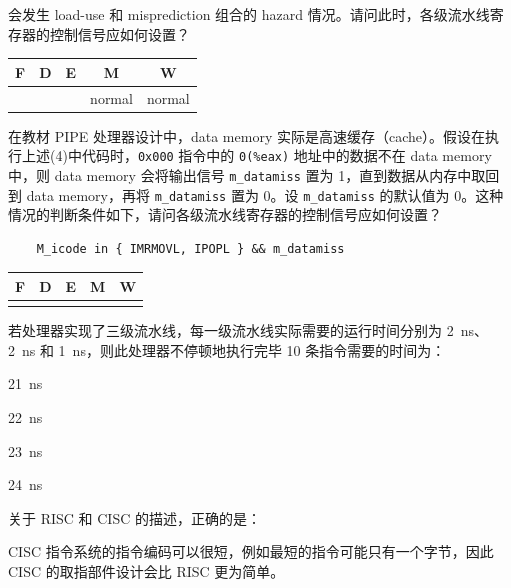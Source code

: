 \begin{problems}
        会发生 load-use 和 misprediction 组合的 hazard 情况。请问此时，各级流水线寄存器的控制信号应如何设置？
        \begin{table}[H]
            \centering
            \begin{tabular}{|c|c|c|c|c|}
                \hline
                F & D & E & M & W \\ \hline
                {\qquad \qquad} & {\qquad \qquad} & {\qquad \qquad} & normal & normal \\ \hline
            \end{tabular}
        \end{table}
        \qn 在教材 PIPE 处理器设计中，data memory 实际是高速缓存（cache）。假设在执行上述(4)中代码时，\verb|0x000| 指令中的 \verb|0(%eax)| 地址中的数据不在 data memory 中，则 data memory 会将输出信号 \verb|m_datamiss| 置为 1，直到数据从内存中取回到 data memory，再将 \verb|m_datamiss| 置为 0。设 \verb|m_datamiss| 的默认值为 0。这种情况的判断条件如下，请问各级流水线寄存器的控制信号应如何设置？
        \begin{verbatim}
    M_icode in { IMRMOVL, IPOPL } && m_datamiss
        \end{verbatim}
        \begin{table}[H]
            \centering
            \begin{tabular}{|c|c|c|c|c|}
                \hline
                F & D & E & M & W \\ \hline
                {\qquad \qquad} & {\qquad \qquad} & {\qquad \qquad} & {\qquad \qquad} & {\qquad \qquad} \\ \hline
            \end{tabular}
        \end{table}
         若处理器实现了三级流水线，每一级流水线实际需要的运行时间分别为 \SI{2}{ns}、\SI{2}{ns} 和 \SI{1}{ns}，则此处理器不停顿地执行完毕 10 条指令需要的时间为：
        \begin{choices}
            \item \SI{21}{ns}
            \item \SI{22}{ns}
            \item \SI{23}{ns}
            \item \SI{24}{ns}
        \end{choices}
         关于 RISC 和 CISC 的描述，正确的是：
        \begin{choices}
            \item CISC 指令系统的指令编码可以很短，例如最短的指令可能只有一个字节，因此 CISC 的取指部件设计会比 RISC 更为简单。

\end{choices}
\end{problems}
